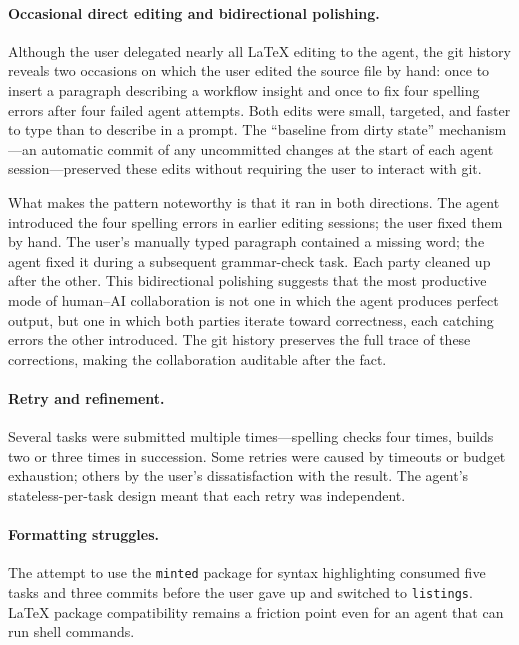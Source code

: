 \documentclass{article}
\begin{document}
\paragraph{Occasional direct editing and bidirectional polishing.}  Although the user delegated nearly all \LaTeX{} editing to the agent, the git history reveals two occasions on which the user edited the source file by hand: once to insert a paragraph describing a workflow insight and once to fix four spelling errors after four failed agent attempts.  Both edits were small, targeted, and faster to type than to describe in a prompt.  The ``baseline from dirty state'' mechanism---an automatic commit of any uncommitted changes at the start of each agent session---preserved these edits without requiring the user to interact with git.

What makes the pattern noteworthy is that it ran in both directions.  The agent introduced the four spelling errors in earlier editing sessions; the user fixed them by hand.  The user's manually typed paragraph contained a missing word; the agent fixed it during a subsequent grammar-check task.  Each party cleaned up after the other.  This bidirectional polishing suggests that the most productive mode of human--AI collaboration is not one in which the agent produces perfect output, but one in which both parties iterate toward correctness, each catching errors the other introduced.  The git history preserves the full trace of these corrections, making the collaboration auditable after the fact.

\paragraph{Retry and refinement.}  Several tasks were submitted multiple times---spelling checks four times, builds two or three times in succession.  Some retries were caused by timeouts or budget exhaustion; others by the user's dissatisfaction with the result.  The agent's stateless-per-task design meant that each retry was independent.

\paragraph{Formatting struggles.}  The attempt to use the \texttt{minted} package for syntax highlighting consumed five tasks and three commits before the user gave up and switched to \texttt{listings}.  \LaTeX{} package compatibility remains a friction point even for an agent that can run shell commands.
\end{document}
